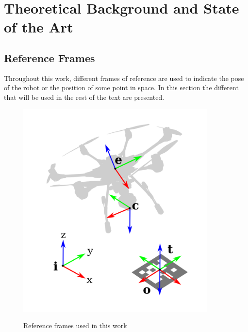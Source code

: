 
\chapter{Theoretical Background and State of the Art}
\label{chap:theory-state-art}

\section{Reference Frames}
\label{sec:reference-frames}

Throughout this work, different frames of reference are used to indicate the pose of the robot or the position of some point in space. In this section the different that will be used in the rest of the text are presented.

\begin{figure}[ht]
	\caption{Reference frames used in this work}
	\centering
	\includegraphics[keepaspectratio, width=10cm]{content/chapter_02/images/frames.png}
	\label{fig:ref_frames}
\end{figure}

\pagebreak

